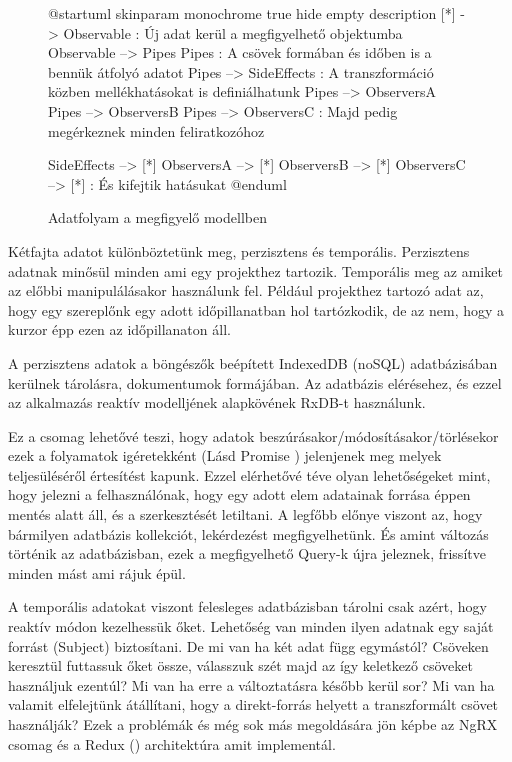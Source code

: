 \begin{figure}[h!]
	\centering
	\begin{plantuml}
		@startuml
		skinparam monochrome true
		hide empty description
		[*] -> Observable : Új adat kerül a megfigyelhető objektumba
		Observable --> Pipes
		Pipes : A csövek formában és időben is  a bennük átfolyó adatot
		Pipes --> SideEffects : A transzformáció közben mellékhatásokat is definiálhatunk
		Pipes --> ObserversA
		Pipes --> ObserversB
		Pipes --> ObserversC : Majd pedig megérkeznek minden feliratkozóhoz

		SideEffects  --> [*]
		ObserversA --> [*]
		ObserversB --> [*]
		ObserversC --> [*] : És kifejtik hatásukat
		@enduml
	\end{plantuml}
	\caption{Adatfolyam a megfigyelő modellben}
	\label{fig:observer-pattern}
\end{figure}

Kétfajta adatot különböztetünk meg, perzisztens és temporális. Perzisztens adatnak minősül minden ami egy projekthez tartozik. Temporális meg az amiket az előbbi manipulálásakor használunk fel. Például projekthez tartozó adat az, hogy egy szereplőnk egy adott időpillanatban hol tartózkodik, de az nem, hogy a kurzor épp ezen az időpillanaton áll.

A perzisztens adatok a böngészők beépített IndexedDB (noSQL) adatbázisában kerülnek tárolásra, dokumentumok formájában. Az adatbázis elérésehez, és ezzel az alkalmazás reaktív modelljének alapkövének RxDB-t \cite{RxDB} használunk.

Ez a csomag lehetővé teszi, hogy adatok beszúrásakor/módosításakor/törlésekor ezek a folyamatok igéretekként (Lásd Promise \cite{Promise}) jelenjenek meg melyek teljesüléséről értesítést kapunk. Ezzel elérhetővé téve olyan lehetőségeket mint, hogy jelezni a felhasználónak, hogy egy adott elem adatainak forrása éppen mentés alatt áll, és a szerkesztését letiltani. A legfőbb előnye viszont az, hogy bármilyen adatbázis kollekciót, lekérdezést megfigyelhetünk. És amint változás történik az adatbázisban, ezek a megfigyelhető Query-k újra jeleznek, frissítve minden mást ami rájuk épül.

A temporális adatokat viszont felesleges adatbázisban tárolni csak azért, hogy reaktív módon kezelhessük őket. Lehetőség van minden ilyen adatnak egy saját forrást (Subject) biztosítani. De mi van ha két adat függ egymástól? Csöveken keresztül futtassuk őket össze, válasszuk szét majd az így keletkező csöveket használjuk ezentúl? Mi van ha erre a változtatásra később kerül sor? Mi van ha valamit elfelejtünk átállítani, hogy a direkt-forrás helyett a transzformált csövet használják? Ezek a problémák és még sok más megoldására jön képbe az NgRX \cite{NgRx} csomag és a Redux (\cite{Redux}) architektúra amit implementál.

